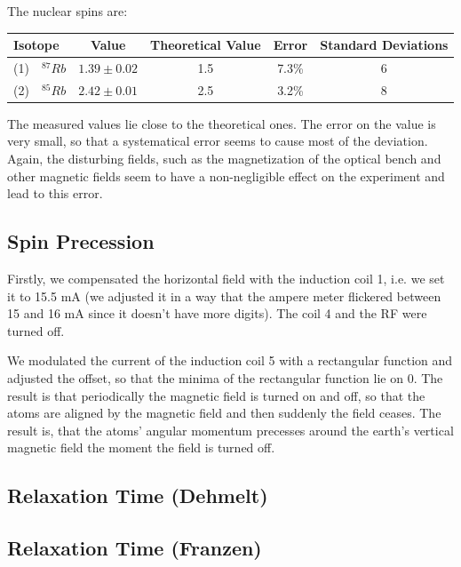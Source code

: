 The nuclear spins are:

\begin{center}
\begin{tabular}[H]{| l c c c c |}\hline
Isotope & Value & Theoretical Value & Error & Standard Deviations \\ \hline
(1)\ \ $^{87}Rb$ & $1.39 \pm 0.02$ & 1.5 & 7.3\% & 6 \\
(2)\ \ $^{85}Rb$ & $2.42 \pm 0.01$ & 2.5 & 3.2\% & 8\\  \hline
\end{tabular}
\end{center}

The measured values lie close to the theoretical ones. The error on the value is very small, so that a systematical error seems to cause most of the deviation. Again, the disturbing fields, such as the magnetization of the optical bench and other magnetic fields seem to have a non-negligible effect on the experiment and lead to this error.

\clearpage
\subsection{Spin Precession}

Firstly, we compensated the horizontal field with the induction coil 1, i.e. we set it to 15.5 mA (we adjusted it in a way that the ampere meter flickered between 15 and 16 mA since it doesn't have more digits). The coil 4 and the RF were turned off.

We modulated the current of the induction coil 5 with a rectangular function and adjusted the offset, so that the minima of the rectangular function lie on 0. The result is that periodically the magnetic field is turned on and off, so that the atoms are aligned by the magnetic field and then suddenly the field ceases. The result is, that the atoms' angular momentum precesses around the earth's vertical magnetic field the moment the field is turned off. 

\subsection{Relaxation Time (Dehmelt)}
\subsection{Relaxation Time (Franzen)}















